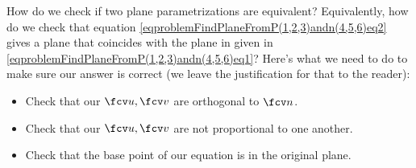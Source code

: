 {How do we check if two plane parametrizations are equivalent? Equivalently, how do we check that equation \eqref{eqproblemFindPlaneFromP(1,2,3)andn(4,5,6)eq2} gives a plane that coincides with the plane in given in \eqref{eqproblemFindPlaneFromP(1,2,3)andn(4,5,6)eq1}? Here's what we need to do to make sure our answer is correct (we leave the justification for that to the reader):
\begin{itemize}
\item Check that our $\fcv u, \fcv v$ are orthogonal to $\fcv n$.
\item Check that our $\fcv u, \fcv v$ are not proportional to one another.
\item Check that the base point of our equation is in the original plane.
\end{itemize}

}

